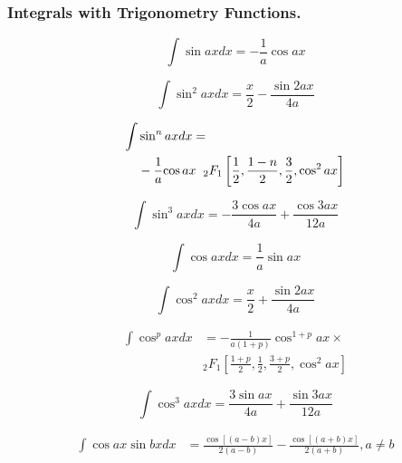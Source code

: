 \documentclass[../main.tex]{subfiles}
\begin{document}
\subsubsection*{Integrals with Trigonometry Functions.}
    
\begin{equation*}
    \int \sin ax dx = -\frac{1}{a} \cos ax 
    \end{equation*}
    
    \begin{equation*}
    \int \sin^2 ax dx = \frac{x}{2} - \frac{\sin 2ax} {4a} 
    \end{equation*}
    
    \begin{align*}
    \int &\sin^n ax dx =
    \nonumber \\ &
     -\frac{1}{a}{\cos ax} \hspace{2mm}{_2F_1}\left[
    \frac{1}{2}, \frac{1-n}{2}, \frac{3}{2}, \cos^2 ax
    \right] 
    \end{align*}
    
    \begin{equation*}
    \int \sin^3 ax dx = -\frac{3 \cos ax}{4a} + \frac{\cos 3ax} {12a} 
    \end{equation*}
    
    \begin{equation*}
    \int \cos ax dx= \frac{1}{a} \sin ax 
    \end{equation*}
    
    \begin{equation*}
    \int \cos^2 ax dx = \frac{x}{2}+\frac{ \sin 2ax}{4a} 
    \end{equation*}
    
    \begin{align*}
    \int \cos^p ax dx & = -\frac{1}{a(1+p)}{\cos^{1+p} ax} \times 
    \nonumber \\ &
    {_2F_1}\left[
    \frac{1+p}{2}, \frac{1}{2}, \frac{3+p}{2}, \cos^2 ax
    \right] 
    \end{align*}
    
    \begin{equation*}
    \int \cos^3 ax dx = \frac{3 \sin ax}{4a}+\frac{ \sin 3ax}{12a} 
    \end{equation*}
    
    \begin{align*}
    \int \cos ax \sin bx dx &= \frac{\cos[(a-b) x]}{2(a-b)} -
     \frac{\cos[(a+b)x]}{2(a+b)} , a\ne b
    \end{align*}
    
\end{document}
